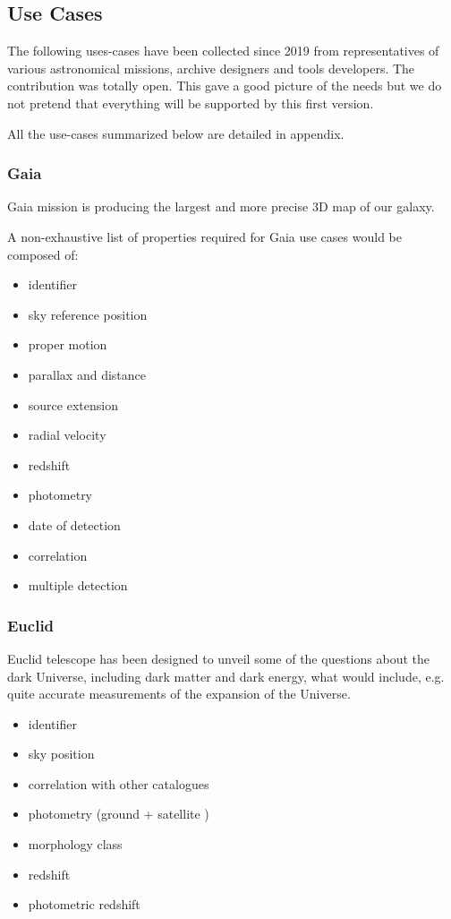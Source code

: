 \documentclass[11pt,a4paper]{ivoa}
\begin{document}
\subsection{Use Cases}
The following uses-cases have been collected since 2019 from representatives of various astronomical 
missions, archive designers and tools developers.
The contribution was totally open. This gave a good picture of the needs but we do not pretend 
that everything will be supported by this first version.

All the use-cases summarized below are detailed in appendix.

\subsubsection{Gaia}
Gaia mission is producing the largest and more precise 3D map of our galaxy.

A non-exhaustive list of properties required for Gaia use cases would be composed
of:

\begin{itemize}
    \item identifier
    \item sky reference position
    \item proper motion
    \item parallax and distance

    \item source extension
    \item radial velocity
    \item redshift
    \item photometry
    \item date of detection
    \item correlation
    \item multiple detection
\end{itemize}

\subsubsection{Euclid}
Euclid telescope has been designed to unveil some of the questions about the
dark Universe, including dark matter and dark energy, what would include, e.g.
quite accurate measurements of the expansion of the Universe.

\begin{itemize}
    \item identifier
    \item sky position
    \item correlation with other catalogues
    \item photometry (ground + satellite )
    \item morphology class
    \item redshift
    \item photometric redshift
\end{itemize}
\end{document}
